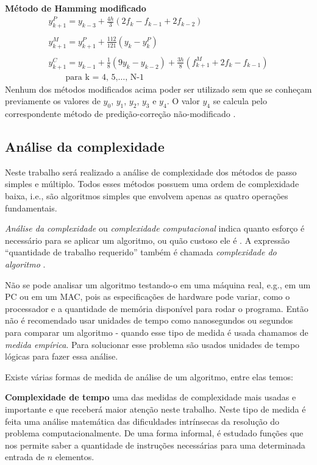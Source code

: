 \textbf{Método de Hamming modificado}
\begin{equation*}
\begin{split}
y^{P}_{k+1} = y_{k-3} + \frac{4h}{3}(2f_{k} - f_{k-1} + 2f_{k-2})\\
\\
y^{M}_{k+1} = y^{P}_{k+1} + \frac{112}{121}(y_{k} - y^{P}_{k})\\
\\
y^{C}_{k+1} = y_{k-1} + \frac{1}{8}(9y_{k} - y_{k-2}) + \frac{3h}{8}(f^{M}_{k+1} + 2f_{k} - f_{k-1})\\
\qquad \text{para k = 4, 5,$\dotsc$, N-1}
\end{split}
\end{equation*}
Nenhum dos métodos modificados acima poder ser utilizado sem que se conheçam previamente
os valores de $y_{0}$, $y_{1}$, $y_{2}$, $y_{3}$ e $y_{4}$. O valor $y_{4}$ se 
calcula pelo correspondente método de predição-correção não-modificado \cite{bronson}.

\subsection{Análise da complexidade}

Neste trabalho será realizado a análise de complexidade dos métodos de passo 
simples e múltiplo. Todos esses métodos possuem uma ordem de complexidade baixa, i.e.,
são algoritmos simples que envolvem apenas as quatro operações fundamentais.

\emph{Análise da complexidade} ou \emph{complexidade computacional} indica quanto
esforço é necessário para se aplicar um algoritmo, ou quão custoso ele é \cite{drozdek}.
A expressão ``quantidade de trabalho requerido'' também é chamada \emph{complexidade do algoritmo} \cite{toscani}.

Não se pode analisar um algoritmo testando-o em uma máquina real, e.g., em um PC ou
em um MAC, pois as especificações de hardware pode variar, como o processador e a
quantidade de memória disponível para rodar o programa. Então não é recomendado usar unidades
de tempo como nanosegundos ou segundos para comparar um algoritmo - quando esse tipo de medida é 
usada chamamos de \emph{medida empírica}. Para solucionar esse problema são usados 
unidades de tempo lógicas para fazer essa análise.

Existe várias formas de medida de análise de um algoritmo, entre elas temos:

\textbf{Complexidade de tempo} uma das medidas de complexidade mais usadas e importante \cite{toscani} e que receberá maior
atenção neste trabalho. Neste tipo de medida é feita uma análise matemática das dificuldades intrínsecas da resolução do 
problema computacionalmente. De uma forma informal, é estudado funções que nos permite saber a quantidade de instruções necessárias
para uma determinada entrada de $n$ elementos.

